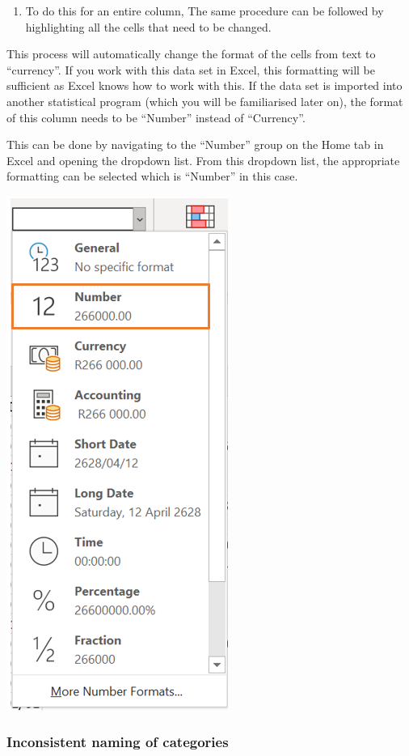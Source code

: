 \documentclass[
]{book}
\providecommand{\tightlist}{%
  \setlength{\itemsep}{0pt}\setlength{\parskip}{0pt}}
\begin{document}
\begin{enumerate}
\def\labelenumi{\arabic{enumi}.}
\setcounter{enumi}{3}
\tightlist
\item
  To do this for an entire column, The same procedure can be followed by highlighting all the cells that need to be changed.
\end{enumerate}

This process will automatically change the format of the cells from text to ``currency''. If you work with this data set in Excel, this formatting will be sufficient as Excel knows how to work with this. If the data set is imported into another statistical program (which you will be familiarised later on), the format of this column needs to be ``Number'' instead of ``Currency''.

This can be done by navigating to the ``Number'' group on the Home tab in Excel and opening the dropdown list. From this dropdown list, the appropriate formatting can be selected which is ``Number'' in this case.

\begin{center}\includegraphics[width=0.4\linewidth]{Figures/cleaning_formatting_4} \end{center}

\subsubsection*{Inconsistent naming of categories}\label{inconsistent-naming-of-categories}
\end{document}
